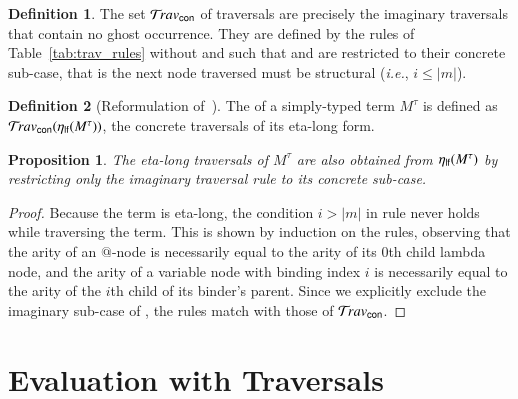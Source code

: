 \documentclass{elsarticle}
\makeatletter
\theoremstyle{plain}
\newtheorem{proposition}[theorem]{Proposition}
\theoremstyle{definition}
\newtheorem{definition}{Definition}[section]
\theoremstyle{remark}
\newcommand{\ghostvar}{\theta}
\newcommand{\concrete}{{\sf con}}
\renewcommand\ie{{\it i.e.\@\xspace}}
\makeatother
\begin{document}
\begin{definition}
    \label{def:concrete_traversals}
The set $\travset_\concrete$ of  traversals
are precisely the imaginary traversals that contain no ghost occurrence.
They are defined by the rules of Table~\ref{tab:trav_rules} without \rulenamet{Lam^\ghostvar} and such that  and  are restricted to their concrete sub-case, that is the next node traversed must be structural (\ie, $i\leq|m|$).

\end{definition}

\begin{definition}[Reformulation of~\cite{BlumPhd}]
The  of a simply-typed term $M^\tau$ is defined as $\travset_{\concrete}(\etalf{M^\tau})$, the concrete traversals of its eta-long form.
\end{definition}

\begin{proposition}
\label{prop:ulc_and_stlc_trav_coincide}
The eta-long traversals of $M^\tau$ are also obtained from
$\eta_{\sf lf}(M^\tau)$ by restricting only the imaginary traversal rule  to its concrete sub-case.
\end{proposition}
\begin{proof}
Because the term is eta-long, the condition $i>|m|$ in rule  never holds while traversing the term. This is shown by induction on the rules, observing that the arity of an $@$-node is necessarily equal to the arity of its $0$th child lambda node, and the arity of a variable node with binding index $i$ is necessarily equal to the arity of the $i$th child of its binder's parent.
Since we explicitly exclude the imaginary sub-case of , the rules match with those of $\travset_\concrete$.
\end{proof}


\section{Evaluation with Traversals}
\label{sec:normalizing_trav}
\end{document}
